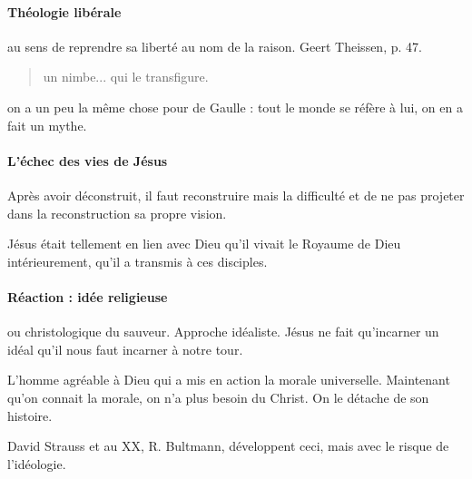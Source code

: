\paragraph{Théologie libérale} au sens de reprendre sa liberté au nom de la raison. Geert Theissen, p. 47. 
\begin{quote}
    
    un nimbe... qui le transfigure. 
\end{quote}
\begin{Ex}
on a un peu la même chose pour de Gaulle : tout le monde se réfère à lui, on en a fait un mythe. 
\end{Ex}

\paragraph{L'échec des vies de Jésus} Après avoir déconstruit, il faut reconstruire mais la difficulté et de ne pas projeter dans la reconstruction sa propre vision. 
\begin{Ex}
Jésus était tellement en lien avec Dieu qu'il vivait le Royaume de Dieu intérieurement, qu'il a transmis à ces disciples.
\end{Ex}

\paragraph{Réaction : idée religieuse} ou christologique du sauveur. Approche idéaliste. Jésus  ne fait qu'incarner un idéal qu'il nous faut incarner à notre tour. 
\begin{Ex}[E Kant]
L'homme agréable à Dieu qui a mis en action la morale universelle. Maintenant qu'on connait la morale, on n'a plus besoin du Christ. On le détache de son histoire. 
\end{Ex}
David Strauss et au XX, R. Bultmann, développent ceci, mais avec le risque de l'idéologie. 

